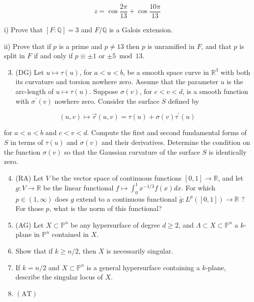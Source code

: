 \documentclass[10pt]{article}
\begin{document}
$$
z=\cos \frac{2 \pi}{13}+\cos \frac{10 \pi}{13}
$$

i) Prove that $[F: \mathbb{Q}]=3$ and $F / \mathbb{Q}$ is a Galois extension.

ii) Prove that if $p$ is a prime and $p \neq 13$ then $p$ is unramified in $F$, and that $p$ is split in $F$ if and only if $p \equiv \pm 1$ or $\pm 5 \bmod 13$.

\begin{enumerate}
  \setcounter{enumi}{2}
  \item (DG) Let $u \mapsto \tau(u)$, for $a<u<b$, be a smooth space curve in $\mathbb{R}^{3}$ with both its curvature and torsion nowhere zero. Assume that the parameter $u$ is the arc-length of $u \mapsto \tau(u)$. Suppose $\sigma(v)$, for $c<v<d$, is a smooth function with $\sigma^{\prime}(v)$ nowhere zero. Consider the surface $S$ defined by
\end{enumerate}

$$
(u, v) \mapsto \vec{r}(u, v)=\tau(u)+\sigma(v) \tau^{\prime}(u)
$$

for $a<u<b$ and $c<v<d$. Compute the first and second fundamental forms of $S$ in terms of $\tau(u)$ and $\sigma(v)$ and their derivatives. Determine the condition on the function $\sigma(v)$ so that the Gaussian curvature of the surface $S$ is identically zero.

\begin{enumerate}
  \setcounter{enumi}{3}
  \item (RA) Let $V$ be the vector space of continuous functions $[0,1] \rightarrow \mathbb{R}$, and let $g: V \rightarrow \mathbb{R}$ be the linear functional $f \mapsto \int_{0}^{1} x^{-1 / 3} f(x) d x$. For which $p \in(1, \infty)$ does $g$ extend to a continuous functional $\bar{g}: L^{p}([0,1]) \rightarrow \mathbb{R}$ ? For those $p$, what is the norm of this functional?

  \item (AG) Let $X \subset \mathbb{P}^{n}$ be any hypersurface of degree $d \geq 2$, and $\Lambda \subset X \subset \mathbb{P}^{n}$ a $k$-plane in $\mathbb{P}^{n}$ contained in $X$.

  \item Show that if $k \geq n / 2$, then $X$ is necessarily singular.

  \item If $k=n / 2$ and $X \subset \mathbb{P}^{n}$ is a general hypersurface containing a $k$-plane, describe the singular locus of $X$.

  \item $(\mathrm{AT})$

\end{enumerate}
\end{document}
